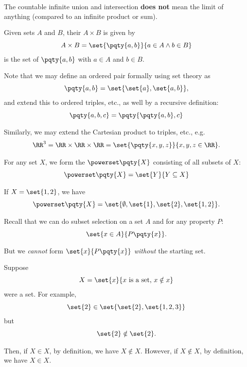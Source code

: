 \begin{remark}
    The countable infinite union and intersection \textbf{does not} mean the limit of anything (compared to an infinite product or sum).
\end{remark}

\begin{definition}
    Given sets \(A\) and \(B\), their  \(A \times B\) is given by
    \[
        A \times B = \set{\pqty{a, b}}{a \in A \land b \in B}
    \]
    is the set of  \(\pqty{a, b}\) with \(a \in A\) and \(b \in B\).
\end{definition}

Note that we may define an ordered pair formally using set theory as
\[
    \pqty{a, b} = \set{\set{a}, \set{a, b}},
\]
and extend this to ordered triples, etc., as well by a recursive definition:
\[
    \pqty{a, b, c} = \pqty{\pqty{a, b}, c}
\]

Similarly, we may extend the Cartesian product to triples, etc., e.g.
\[
    \RR^3 = \RR \times \RR \times \RR = \set{\pqty{x, y, z}}{x, y, z \in \RR}.
\]

\begin{definition}
    For any set \(X\), we form the  \(\powerset\pqty{X}\) consisting of all subsets of \(X\):
    \[
        \powerset\pqty{X} = \set{Y}{Y \subseteq X}
    \]
\end{definition}

\begin{example}
    If \(X = \set{1, 2}\), we have
    \[
        \powerset\pqty{X} = \set{\emptyset, \set{1}, \set{2}, \set{1, 2}}.
    \]
\end{example}

Recall that we can do subset selection on a set \(A\) and for any property \(P\):
\[
    \set{x \in A}{P\pqty{x}}.
\]

But we \emph{cannot} form \(\set{x}{P\pqty{x}}\) \emph{without} the starting set.

\begin{example}
    Suppose
    \[
        X = \set{x}{x\text{ is a set, } x \notin x}
    \]  
    were a set. For example,
    \[
        \set{2} \in \set{\set{2}, \set{1, 2, 3}}
    \]
    but
    \[
        \set{2} \notin \set{2}.
    \]

    Then, if \(X \in X\), by definition, we have \(X \notin X\). However, if \(X \notin X\), by definition, we have \(X \in X\).
\end{example}

